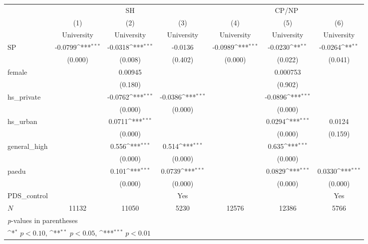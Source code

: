 \documentclass{beamer}
\def\sym#1{\ifmmode^{#1}\else\(^{#1}\)\fi}
\begin{document}
\begin{frame}[shrink=38]
\centering
\begin{tabular}{l*{6}c}
    \toprule
    &\multicolumn{3}{c}{SH} &\multicolumn{3}{c}{CP/NP} \\
    \cmidrule(l){2-4}\cmidrule(l){5-7}
    &\multicolumn{1}{c}{(1)}&\multicolumn{1}{c}{(2)}&\multicolumn{1}{c}{(3)}&\multicolumn{1}{c}{(4)}&\multicolumn{1}{c}{(5)}&\multicolumn{1}{c}{(6)} \\
    &\multicolumn{1}{c}{University}&\multicolumn{1}{c}{University}&\multicolumn{1}{c}{University}&\multicolumn{1}{c}{University}&\multicolumn{1}{c}{University}&\multicolumn{1}{c}{University} \\
    \midrule
    SP & -0.0799\sym{***}& -0.0318\sym{***}& -0.0136     & -0.0989\sym{***}& -0.0230\sym{**} & -0.0264\sym{**} \\
    & (0.000)     & (0.008)     & (0.402)     & (0.000)     & (0.022)     & (0.041)     \\
    [1em]
    female  &   & 0.00945     &   &   &    0.000753     &   \\
    &   & (0.180)     &   &   & (0.902)     &   \\
    [1em]
    hs\_private  &   & -0.0762\sym{***}& -0.0386\sym{***}&   & -0.0896\sym{***}&   \\
    &   & (0.000)     & (0.000)     &   & (0.000)     &   \\
    [1em]
    hs\_urban    &   &  0.0711\sym{***}&   &   &  0.0294\sym{***}&  0.0124     \\
    &   & (0.000)     &   &   & (0.000)     & (0.159)     \\
    [1em]
    general\_high&   &   0.556\sym{***}&   0.514\sym{***}&   &   0.635\sym{***}&   \\
    &   & (0.000)     & (0.000)     &   & (0.000)     &   \\
    [1em]
    paedu   &   &   0.101\sym{***}&  0.0739\sym{***}&   &  0.0829\sym{***}&  0.0330\sym{***}\\
    &   & (0.000)     & (0.000)     &   & (0.000)     & (0.000)     \\
    [1em]
    PDS\_control  &   &  &  Yes    &  &    &  Yes \\
    \hline
    \(N\)   &   11132     &   11050     &    5230     &   12576     &   12386     &    5766     \\
    \bottomrule
    \multicolumn{7}{l}{\footnotesize \textit{p}-values in parentheses} \\
    \multicolumn{7}{l}{\footnotesize \sym{*} \(p<0.10\), \sym{**} \(p<0.05\), \sym{***} \(p<0.01\)} \\
\end{tabular}

\end{frame}
\end{document}
